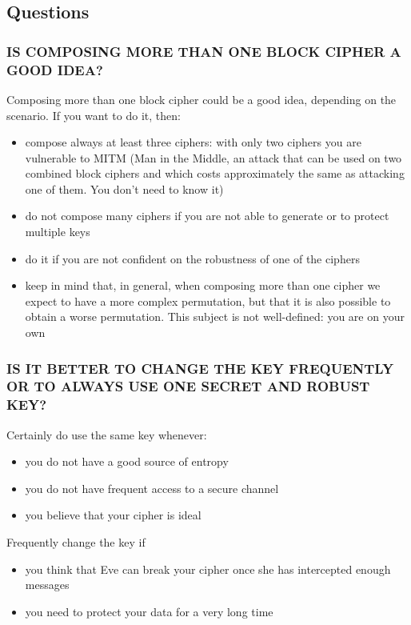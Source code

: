 \documentclass[a4paper, 10pt, titlepage]{article}
\begin{document}
\subsection{Questions}
\subsubsection*{IS COMPOSING MORE THAN ONE BLOCK CIPHER A GOOD IDEA?}
Composing more than one block cipher could be a good idea, depending on the scenario. If you want to do it, then:
\begin{itemize}
\item compose always at least three ciphers: with only two ciphers you are vulnerable to MITM (Man in the Middle, an attack that can be used on two combined block ciphers and which costs approximately the same as attacking one of them. You don't need to know it)
\item do not compose many ciphers if you are not able to generate or to protect multiple keys
\item do it if you are not confident on the robustness of one of the ciphers
\item keep in mind that, in general, when composing more than one cipher we expect to have a more complex permutation, but that it is also possible to obtain a worse permutation. This subject is not well-defined: you are on your own
\end{itemize}

\subsubsection*{IS IT BETTER TO CHANGE THE KEY FREQUENTLY OR TO ALWAYS USE ONE SECRET AND ROBUST KEY?}
Certainly do use the same key whenever:
\begin{itemize}
\item you do not have a good source of entropy
\item you do not have frequent access to a secure channel
\item you believe that your cipher is ideal
\end{itemize}
Frequently change the key if
\begin{itemize}
\item you think that Eve can break your cipher once she has intercepted enough messages
\item you need to protect your data for a very long time
\end{itemize}
\end{document}
